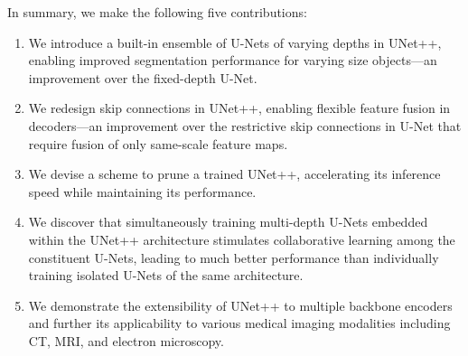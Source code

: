 In summary, we make the following five contributions:
\begin{enumerate}
  \item We introduce a built-in ensemble of U-Nets of varying depths in UNet++, enabling improved segmentation performance for varying size objects---an improvement over the fixed-depth U-Net.
  \item We redesign skip connections in UNet++, enabling flexible feature fusion in decoders---an improvement over the restrictive skip connections in U-Net that require fusion of only same-scale feature maps.
  \item We devise a scheme to prune a trained UNet++, accelerating its inference speed while maintaining its performance.
  \item We discover that simultaneously training multi-depth U-Nets embedded within the UNet++ architecture stimulates collaborative learning among the constituent U-Nets, leading to much better performance than individually training isolated U-Nets of the same architecture.
  \item We demonstrate the extensibility of UNet++ to multiple backbone encoders and further its applicability to various medical imaging modalities including CT, MRI, and electron microscopy.
\end{enumerate}



